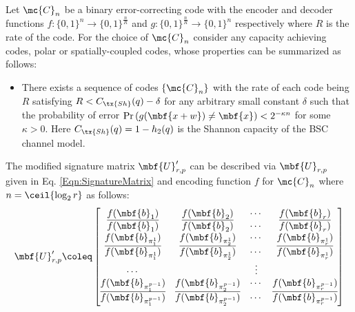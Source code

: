\documentclass[conference,twocolumn]{IEEEtran}
\begin{document}
Let $\mc{C}_n$ be a binary error-correcting code with the encoder and decoder functions $f:\{0,1\}^{n}\rightarrow \{0,1\}^{\frac{n}{R}}$ and $g:\{0,1\}^{\frac{n}{R}}\rightarrow \{0,1\}^{n}$ respectively where $R$ is the rate of the code.
For the choice of $\mc{C}_n$ consider any capacity achieving codes, polar or spatially-coupled codes, whose properties can be summarized as follows: 
\begin{itemize}
\item There exists a sequence of codes $\{\mc{C}_n\}$ with the rate of each code being $R$ satisfying $R< C_{\tx{Sh}}(q)-\delta$ for any arbitrary small constant $\delta$ such that the probability of error $\text{Pr}\left(g(\mbf{x+w})\neq \mbf{x}\right)<2^{-\kappa n}$ for some $\kappa >0$. Here $C_{\tx{Sh}}(q)=1-h_2(q)$ is the Shannon capacity of the BSC channel model.
\end{itemize} 
The modified signature matrix $\mbf{U}'_{r,p}$ can be described via $\mbf{U}_{r, p}$ given in Eq. \eqref{Eqn:SignatureMatrix} and encoding function $f$ for $\mc{C}_n$ where $n=\ceil{\log_2 r}$ as follows:
 \begin{align}
\label{Eqn:SignatureMatrixModified}
\mbf{U}_{r,p}'\coleq\begin{bmatrix}
f(\mbf{b}_1)  & f(\mbf{b}_2) &\cdots & f(\mbf{b}_r) \\
\overline{f(\mbf{b}_1)} & \overline{f(\mbf{b}_2)} & \cdots & \overline{f(\mbf{b}_r)}\\
f(\mbf{b}_{\pi^{1}_{1}}) & f(\mbf{b}_{\pi^{1}_{2}}) & \cdots & f(\mbf{b}_{\pi^{1}_{r}})\\
\overline{f(\mbf{b}_{\pi^{1}_{1}})} & \overline{f(\mbf{b}_{\pi^{1}_{2}})} & \cdots & \overline{f(\mbf{b}_{\pi^{1}_{r}})}\\
\cdots &  &\vdots \\
f(\mbf{b}_{\pi^{p-1}_{1}}) & f(\mbf{b}_{\pi^{p-1}_{2}}) & \cdots & f(\mbf{b}_{\pi^{p-1}_{r}})\\
\overline{f(\mbf{b}_{\pi^{p-1}_{1}})} & \overline{f(\mbf{b}_{\pi^{p-1}_{2}})} & \cdots & \overline{f(\mbf{b}_{\pi^{p-1}_{r}})}\\
\end{bmatrix}
\end{align}  
\end{document}
